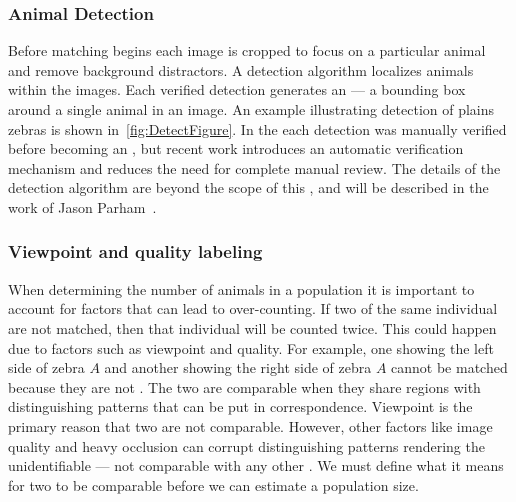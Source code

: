         \subsubsection{Animal Detection}
            Before matching begins each image is cropped to focus on a
              particular animal and remove background distractors.
            A detection algorithm localizes animals within the images.
            Each verified detection generates an \glossterm{\annot{}}
              --- a bounding box around a single animal in an image.
            An example illustrating detection of plains zebras is shown
              in~\cref{fig:DetectFigure}.
            In the \GZC{} each detection was manually verified before
              becoming an \annot{}, but recent work introduces an
              automatic verification mechanism and reduces the need for
              complete manual review.
            The details of the detection algorithm are beyond the scope
              of this \thesis{}, and will be described in the work of
              Jason Parham~\cite{parham_photographic_2015}.

            \DetectFigure{}

        \subsubsection{Viewpoint and quality labeling}\label{sub:viewqual}
            When determining the number of animals in a population it
              is important to account for factors that can lead to
              over-counting.
            If two \annots{} of the same individual are not matched,
              then that individual will be counted twice.
            This could happen due to factors such as viewpoint and
              quality.
            For example, one \annot{} showing the left side of zebra
              $A$ and another \annot{} showing the right side of zebra
              $A$ cannot be matched because they are not
              .
            The two \annots{} are comparable when they share regions
              with distinguishing patterns that can be put in
              correspondence.
            Viewpoint is the primary reason that two \annots{} are
              not comparable.
            However, other factors like image quality and heavy
              occlusion can corrupt distinguishing patterns rendering the
              \annot{} unidentifiable --- not comparable with any other
              \annot{}.
            We must define what it means for two \annots{} to be
              comparable before we can estimate a population size.

